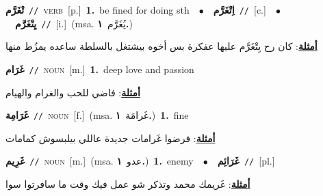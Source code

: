 \documentclass[10pt,a4paper,twoside]{article} %
\begin{document}
\begin{multicols}{2}
{\setlength\topsep{0pt}\textbf{\foreignlanguage{arabic}{تْغَرَّم}}\ {\color{gray}\texttt{//}\color{black}}\ \textsc{verb}\ [p.]\ \textbf{1.}~be fined for doing sth\ \ $\bullet$\ \ \setlength\topsep{0pt}\textbf{\foreignlanguage{arabic}{اِتْغَرَّم}}\ {\color{gray}\texttt{//}\color{black}}\ [c.]\ \ $\bullet$\ \ \setlength\topsep{0pt}\textbf{\foreignlanguage{arabic}{يِتْغَرَّم}}\ {\color{gray}\texttt{//}\color{black}}\ [i.]\ \color{gray}(msa. \foreignlanguage{arabic}{يُغَرَّم}~\foreignlanguage{arabic}{\textbf{١.}})\color{black}\  \begin{flushright}\color{gray}\foreignlanguage{arabic}{\textbf{\underline{\foreignlanguage{arabic}{أمثلة}}}: كان رح يِتْغَرَّم عليها عفكرة بس أخوه بيشتغل بالسلطة ساعده يمزُط منها}\end{flushright}\color{black}} \vspace{2mm}

{\setlength\topsep{0pt}\textbf{\foreignlanguage{arabic}{غَرَام}}\ {\color{gray}\texttt{//}\color{black}}\ \textsc{noun}\ [m.]\ \textbf{1.}~deep love and passion\  \begin{flushright}\color{gray}\foreignlanguage{arabic}{\textbf{\underline{\foreignlanguage{arabic}{أمثلة}}}: فاضي للحب والغرام والهيام}\end{flushright}\color{black}} \vspace{2mm}

{\setlength\topsep{0pt}\textbf{\foreignlanguage{arabic}{غَرَامِة}}\ {\color{gray}\texttt{//}\color{black}}\ \textsc{noun}\ [f.]\ \color{gray}(msa. \foreignlanguage{arabic}{غَرامَة}~\foreignlanguage{arabic}{\textbf{١.}})\color{black}\ \textbf{1.}~fine\  \begin{flushright}\color{gray}\foreignlanguage{arabic}{\textbf{\underline{\foreignlanguage{arabic}{أمثلة}}}: فرضوا غَرامات جديدة عاللي بيلبسوش كمامات}\end{flushright}\color{black}} \vspace{2mm}

{\setlength\topsep{0pt}\textbf{\foreignlanguage{arabic}{غَرِيم}}\ {\color{gray}\texttt{//}\color{black}}\ \textsc{noun}\ [m.]\ \color{gray}(msa. \foreignlanguage{arabic}{عدو}~\foreignlanguage{arabic}{\textbf{١.}})\color{black}\ \textbf{1.}~enemy\ \ $\bullet$\ \ \setlength\topsep{0pt}\textbf{\foreignlanguage{arabic}{غَرَائِم}}\ {\color{gray}\texttt{//}\color{black}}\ [pl.]\  \begin{flushright}\color{gray}\foreignlanguage{arabic}{\textbf{\underline{\foreignlanguage{arabic}{أمثلة}}}: غَريمك محمد وتذكر شو عمل فيك وقت ما سافرتوا سوا}\end{flushright}\color{black}} \vspace{2mm}


\end{multicols}
\end{document}
